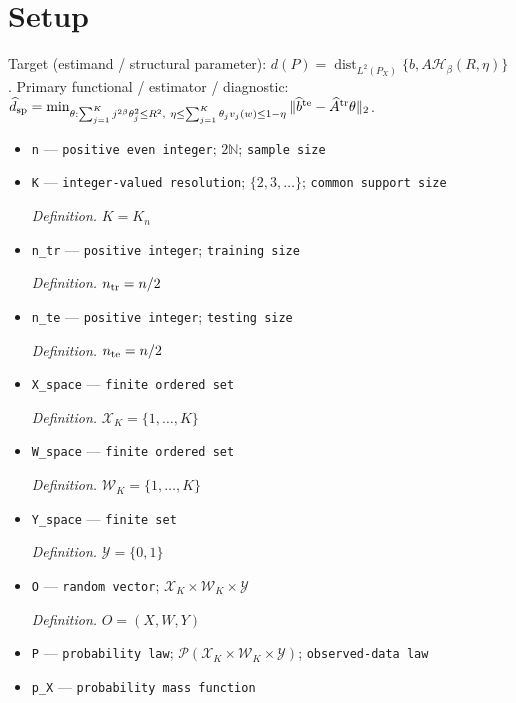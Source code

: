 \documentclass{article}
\begin{document}
\section{Setup}

Target (estimand / structural parameter): \(d(P)=\operatorname{dist}_{L^2(P_X)}\{b,A\mathcal H_\beta(R,\eta)\}\).
Primary functional / estimator / diagnostic: \(\widehat d_{\rm sp}=\min_{\theta:\sum_{j=1}^K j^{2\beta}\theta_j^2\le R^2,\ \eta\le\sum_{j=1}^K\theta_jv_j(w)\le1-\eta}\|\widehat b^{\rm te}-\widehat A^{\rm tr}\theta\|_2\).
\begin{itemize}
  \item \texttt{n} --- \texttt{positive even integer}; \(2\mathbb N\); \texttt{sample size}
  \item \texttt{K} --- \texttt{integer-\allowbreak{}valued resolution}; \(\{2,3,\ldots\}\); \texttt{common support size}
  \par\smallskip\noindent\emph{Definition.} \(K=K_n\)
  \item \texttt{n\_\allowbreak{}tr} --- \texttt{positive integer}; \texttt{training size}
  \par\smallskip\noindent\emph{Definition.} \(n_{\rm tr}=n/2\)
  \item \texttt{n\_\allowbreak{}te} --- \texttt{positive integer}; \texttt{testing size}
  \par\smallskip\noindent\emph{Definition.} \(n_{\rm te}=n/2\)
  \item \texttt{X\_\allowbreak{}space} --- \texttt{finite ordered set}
  \par\smallskip\noindent\emph{Definition.} \(\mathcal X_K=\{1,\ldots,K\}\)
  \item \texttt{W\_\allowbreak{}space} --- \texttt{finite ordered set}
  \par\smallskip\noindent\emph{Definition.} \(\mathcal W_K=\{1,\ldots,K\}\)
  \item \texttt{Y\_\allowbreak{}space} --- \texttt{finite set}
  \par\smallskip\noindent\emph{Definition.} \(\mathcal Y=\{0,1\}\)
  \item \texttt{O} --- \texttt{random vector}; \(\mathcal X_K\times\mathcal W_K\times\mathcal Y\)
  \par\smallskip\noindent\emph{Definition.} \(O=(X,W,Y)\)
  \item \texttt{P} --- \texttt{probability law}; \(\mathcal P(\mathcal X_K\times\mathcal W_K\times\mathcal Y)\); \texttt{observed-\allowbreak{}data law}
  \item \texttt{p\_\allowbreak{}X} --- \texttt{probability mass function}

\end{itemize}
\end{document}
